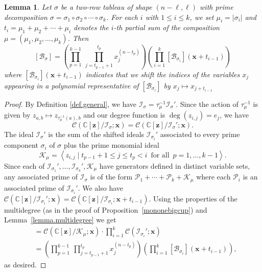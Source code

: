 \documentclass[11pt]{amsart}
\newtheorem{lemma}[theorem]{Lemma}
\theoremstyle{remark}
\theoremstyle{remark}
\theoremstyle{definition}
\theoremstyle{definition}
\theoremstyle{definition}
\numberwithin{equation}{section}
\newcommand{\C}{\mathbb{C}}           %
\newcommand{\gs}{\sigma}
\newcommand{\cb}{\mathcal{B}}
\newcommand{\cc}{\mathcal{C}}
\newcommand{\ci}{\mathcal{I}}
\newcommand{\cp}{\mathcal{P}} %
\newcommand{\SF}{\mathcal{B}}
\newcommand{\isigma}{\ci_\gs}
\newcommand{\parsum}{t}
\begin{document}
\begin{lemma}\label{lemma.genformula}
Let $\gs$ be a two-row tableau of shape $(n-\ell,\ell)$ with prime decomposition $\gs=\gs_1\circ\gs_2\circ\cdots\circ\gs_k$. For each $i$ with $1\leq i \leq k$, we set $\mu_i = |\gs_i|$ and $\parsum_i = \mu_1+\mu_2+\cdots +\mu_{i}$ denotes the $i$-th partial sum of the composition $\mu=(\mu_1, \mu_2, \ldots, \mu_k)$.
Then
\begin{equation}\label{eqn.genmultideg}
[\cb_\gs]=\left( \prod_{p=1}^{k-1}~ \prod_{j=\parsum_{p-1}+1}^{\parsum_p} x_j^{(n-\parsum_p)}\right) \left( \prod_{i=1}^k[\cb_{\gs_i}](\mathbf{x}+\parsum_{i-1}) \right)
\end{equation}
where $[\cb_{\gs_i}](\mathbf{x}+\parsum_{i-1})$ indicates that we shift the indices of the variables $x_j$ appearing in a polynomial representative of $[\SF_{\gs_i}]$ by $x_j\mapsto x_{j+\parsum_{i-1}}$
\end{lemma}

\begin{proof} By Definition \ref{def.general}, we have  $\isigma = \tau_\mu^{-1}\isigma'$. Since the action of $\tau_\mu^{-1}$ is given by $z_{a,b}\mapsto z_{\tau_\mu^{-1}(a),b}$ and our degree function is $\deg(z_{i,j}) = e_j$, we have
\[
\cc(\C[\mathbf{z}]/\isigma; \mathbf{x}) = \cc(\C[\mathbf{z}]/\isigma'; \mathbf{x}).
\]
The ideal $\isigma'$ is the sum of the shifted ideals $\ci_{\gs_i}'$ associated to every prime component $\gs_i$ of $\gs$ plus the prime monomial ideal
\begin{equation}\label{eqn.extragenI}
\mathcal{K}_\mu=\left< z_{i,j}\mid \parsum_{p-1} +1\leq j \leq \parsum_p <i \, \text{ for all }\, p= 1, \ldots ,k-1 \right>.
\end{equation}
Since each of $\ci_{\gs_1}', \ldots, \ci_{\gs_k}', \mathcal{K}_\mu$ have generators defined in distinct variable sets, any associated prime of $\ci_\gs$ is of the form $\cp_1+\cdots  + \cp_k+\mathcal{K}_\mu$ where each $\cp_i$ is an associated prime of $\ci_{\gs_i}'$. We also have $\cc(\C[\mathbf{z}]/\ci_{\gs_i}'; \mathbf{x}) = \cc(\C[\mathbf{z}]/\ci_{\gs_i}; \mathbf{x}+t_{i-1})$.
Using the properties of the multidegree (as in the proof of Proposition~\ref{mononebigcup}) and Lemma~\ref{lemma.multidegree} we get  
\begin{align*}
[\SF_{\gs}] &= \cc(\C[\mathbf{z}]/\mathcal{K}_\mu; \mathbf{x}) \cdot \prod_{i=1}^k \cc(\ci_{\gs_i}'; \mathbf{x}) \\
& = \left( \prod_{p=1}^{k-1}~ \prod_{j=\parsum_{p-1}+1}^{\parsum_p} x_j^{(n-\parsum_p)}\right)\left( \prod_{i=1}^k[\cb_{\gs_i}](\mathbf{x}+\parsum_{i-1}) \right),
\end{align*}
as desired.
\end{proof}
\end{document}
